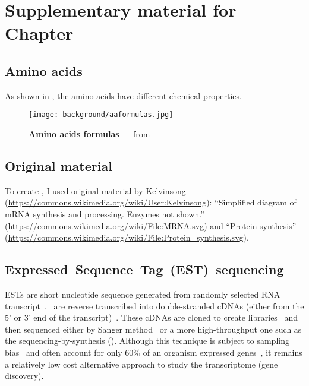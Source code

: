 \chapter{Suppl\texorpdfstring{ementary}{.} material for Chap\texorpdfstring{ter}{.} }%
\label{ch:SupplBack}

\section{Amino acids}\label{sec:aa}

As shown in ,
the amino acids have different chemical properties.

\begin{figure}[htpb]
    \texttt{[image: background/aaformulas.jpg]}\centering
    \caption[Amino acids formulas]{\label{fig:aaformulas}%
    \textbf{Amino acids formulas} --- from \citet{Morris2016-qv}}
\end{figure}

\section{Original material}\label{sec:kelvinsong}
\vspace{-5mm}
To create ,
I used original material
by Kelvinsong (\href{https://commons.wikimedia.org/wiki/User:Kelvinsong}{https://commons.wikimedia.org/wiki/User:Kelvinsong}):
\enquote{Simplified diagram of mRNA synthesis and processing. Enzymes not shown.}
(\href{https://commons.wikimedia.org/wiki/File:MRNA.svg}{https://commons.wikimedia.org/wiki/File:MRNA.svg})
and
\enquote{Protein synthesis} (\href{https://commons.wikimedia.org/wiki/File:Protein\_synthesis.svg}%
{https://commons.wikimedia.org/wiki/File:Protein\_synthesis.svg}).

\vspace{-3mm}
\section[EST-sequencing]{Expressed~Sequence~Tag~(EST)~sequencing}\label{sec:EST}
\vspace{-5mm}
\glspl{EST} are short nucleotide sequence generated
from randomly selected \gls{RNA} transcript~.
\mRNAs\ are reverse transcribed into double-stranded \glspl{cDNA}
(either from the 5' or 3' end of the transcript)~.
These \glspl{cDNA} are cloned to create libraries~
and then sequenced either by Sanger method~ or
a more high-throughput one such as
the sequencing-by-synthesis ().
Although this technique is subject to sampling bias~ and
often account for only 60\% of an organism expressed genes~,
it remains a relatively low cost alternative approach to study the transcriptome
(gene discovery).


